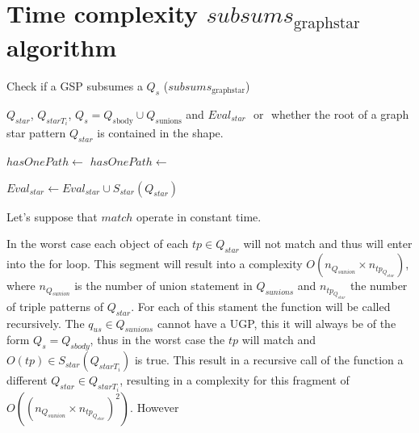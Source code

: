 \section{Time complexity $subsums_{\mathrm{graph star}}$ algorithm}


\begin{algorithm}[h]
    \caption{Check if a GSP subsumes a $Q_s$ ($subsums_{\mathrm{graph star}}$)}\label{alg:containmentTree}
    \begin{algorithmic}
       \scriptsize
 
       \REQUIRE  $Q_{star}$, $Q_{starT_i}$, $Q_s = Q_{s\mathrm{body}} \cup Q_{s\mathrm{unions}}$ and $Eval_{star}$
       \ENSURE \TRUE $ $ or \FALSE $ $ whether the root of a graph star pattern $Q_{star}$ is contained in the shape.
 
          \RETURN \TRUE
       \ENDIF 
 
             \STATE $hasOnePath \gets $ \FALSE
                   \STATE $hasOnePath \gets $ \TRUE
                \ENDIF
             \ENDFOR
                \RETURN \FALSE
             \ENDIF
          \ELSE
                   \RETURN \FALSE
                \ENDIF
             \ENDIF
          \ENDIF
       \ENDFOR
 
       \STATE $Eval_{star} \gets Eval_{star} \cup S_{star}(Q_{star})$
       \RETURN \TRUE
    \end{algorithmic}
 \end{algorithm}

 Let's suppose that $match$ operate in constant time.

 In the worst case each object of each $tp \in Q_{star}$ will not match and thus will enter into the for loop.
 This segment will result into a complexity $O(n_{Q_{sunion}} \times n_{tp_{ Q_{star}}})$, 
 where $n_{Q_{sunion}}$ is the number of union statement in $Q_{sunions}$ and $n_{tp_{ Q_{star}}}$ the number of triple patterns
 of $Q_{star}$.
 For each of this stament the function will be called recursively.
 The $q_{us} \in Q_{sunions}$ cannot have a UGP, this it will always be of the form $Q_s = Q_{sbody}$, thus in the worst case
 the $tp$ will match and $O(tp) \in  S_{star}(Q_{starT_i})$ is true.
 This result in a recursive call of the function a different $Q_{star} \in Q_{starT_i}$, resulting in a 
 complexity for this fragment of $O((n_{Q_{sunion}} \times n_{tp_{ Q_{star}}})^2)$.
 However